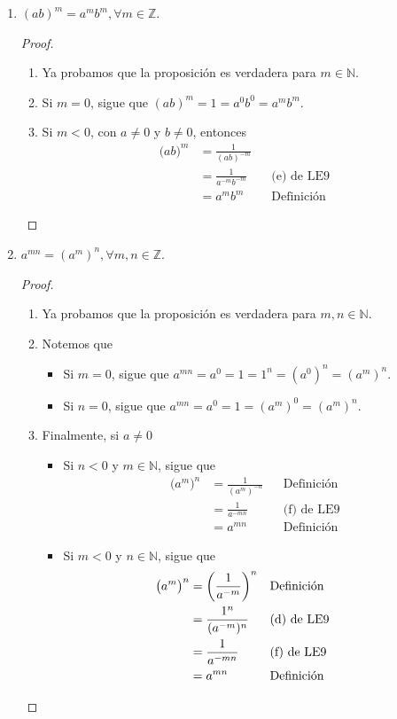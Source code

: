 \documentclass[11pt]{article}
\newcommand{\N}{\mathbb{N}}
\newcommand{\Z}{\mathbb{Z}}
\begin{document}
\begin{enumerate}[label=\alph*)]
  \item $(ab)^m = a^mb^m, \forall m\in \Z$.
  \begin{proof}\leavevmode
    \begin{enumerate}
      \item Ya probamos que la proposición es verdadera para $m\in \N$.
      \item Si $m=0$, sigue que $(ab)^m = 1 = a^0b^0 = a^mb^m$.
      \item Si $m<0$, con $a\neq 0$ y $b\neq 0$, entonces \begin{align*}
        \bigl(ab\bigr)^m &= \frac{1}{(ab)^{-m}}\\
        &= \frac{1}{a^{-m}b^{-m}} && \text{(e) de LE9}\\
        &= a^mb^m && \text{Definición}
      \end{align*}
    \end{enumerate}
  \end{proof}

  \item $a^{mn} = (a^m)^n, \forall m,n \in \Z$.
  \begin{proof}\leavevmode
    \begin{enumerate}[label=\roman*)]
      \item Ya probamos que la proposición es verdadera para $m,n\in \N$.
      \item Notemos que \begin{itemize}
        \item Si $m=0$, sigue que $a^{mn} = a^0 = 1 = 1^n = (a^0)^n = (a^m)^n$.
        \item Si $n=0$, sigue que $a^{mn} = a^0 = 1 = (a^m)^0 = (a^m)^n$.
      \end{itemize}
      \item Finalmente, si $a\neq 0$ \begin{itemize}
        \item Si $n<0$ y $m\in \N$, sigue que \begin{align*}
          \bigl(a^m\bigr)^n &= \frac{1}{(a^m)^{-n}} && \text{Definición}\\
          &= \frac{1}{a^{-mn}} && \text{(f) de LE9}\\
          &= a^{mn} && \text{Definición}
        \end{align*}
        \item Si $m<0$ y $n\in \N$, sigue que \begin{align*}
          \bigl(a^m\bigr)^n &= \left(\frac{1}{a^{-m}}\right)^n && \text{Definición}\\
          &= \frac{1^n}{(a^{-m})^n} && \text{(d) de LE9}\\
          &= \frac{1}{a^{-mn}} && \text{(f) de LE9}\\
          &= a^{mn} && \text{Definición} && \qedhere
        \end{align*}
      \end{itemize}
    \end{enumerate}
  \end{proof}

 \end{enumerate}
\end{document}
